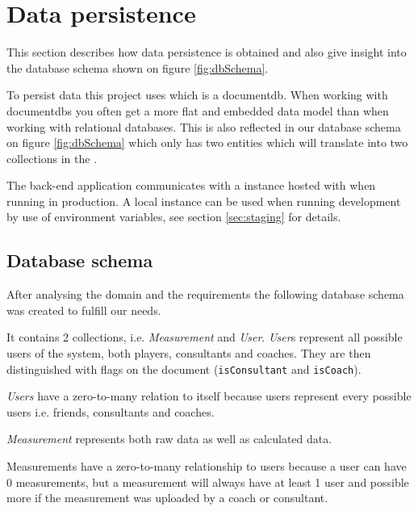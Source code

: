\section{Data persistence}
This section describes how data persistence is obtained and also give insight into the database schema shown on figure \ref{fig:dbSchema}.

To persist data this project uses  which is a \gls{documentdb}.
When working with \glspl{documentdb} you often get a more flat and embedded data model than when working with relational databases. 
This is also reflected in our database schema on figure \ref{fig:dbSchema} which only has two entities which will translate into two collections in the .

The back-end application communicates with a  instance hosted with  when running in production.
A local instance can be used when running development by use of environment variables, see section \ref{sec:staging} for details.

\subsection{Database schema}
After analysing the domain and the requirements the following database schema was created to fulfill our needs.

It contains 2 collections, i.e. \textit{Measurement} and \textit{User}. \textit{User}s represent all possible users of the system, both players, consultants and coaches. 
They are then distinguished with flags on the document (\verb+isConsultant+ and \verb+isCoach+).

\textit{Users} have a zero-to-many relation to itself because users represent every possible users i.e. friends, consultants and coaches.

\textit{Measurement} represents both raw data as well as calculated data.

Measurements have a zero-to-many relationship to users because a user can have 0 measurements, but a measurement will always have at least 1 user and possible more if the measurement was uploaded by a coach or consultant.

